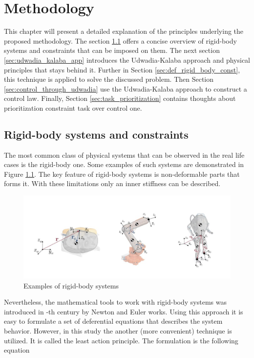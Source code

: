 \chapter{Methodology}
\label{chap:met}

This chapter will present a detailed explanation of the principles underlying the 
proposed methodology. The section \ref{sec:rigid_body_and_const} offers a concise 
overview of rigid-body systems and constraints that can be imposed on them.
The next section \ref{sec:udwadia_kalaba_app} introduces the Udwadia-Kalaba 
approach and physical principles that stays behind it. Further in Section 
\ref{sec:def_rigid_body_const}, this technique is applied to solve the discussed 
problem. Then Section \ref{sec:control_through_udwadia} use the Udwadia-Kalaba 
approach to construct a control law. Finally, Section 
\ref{sec:task_prioritization} contains thoughts about prioritization constraint 
task over control one. 

\section{Rigid-body systems and constraints} 
\label{sec:rigid_body_and_const}

The most common class of physical systems that can be observed in the real life 
cases is the rigid-body one. Some examples of such systems are demonstrated in 
Figure \ref{fig:examples_of_rig_sys}. The key feature of rigid-body systems 
is non-deformable parts that forms it. With these limitations only an 
inner stiffness can be described.

\begin{figure}[H]
    \centering
    \includegraphics[scale=0.5]{figs/rigid_body_systems.png}
    \caption{Examples of rigid-body systems}
    \label{fig:examples_of_rig_sys}
\end{figure}


Nevertheless, the mathematical tools to work with rigid-body systems was introduced 
in -th century by Newton and Euler works. Using this approach it is easy 
to formulate a set of deferential equations that describes the system behavior.
However, in this study the another (more convenient) technique is utilized. It is 
called the least action principle. The formulation is the following equation

